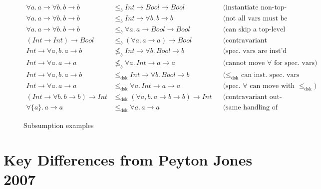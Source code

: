 \documentclass[11pt,a4paper]{article}
\begin{document}
\begin{figure}[h]
\centering
\small
\begin{align*}
\forall a.\, a \to \forall b.\, b \to b &\leq_b \mathit{Int} \to \mathit{Bool} \to \mathit{Bool} 
&&\text{(instantiate non-top-level vars)} \\
\forall a.\, a \to \forall b.\, b \to b &\leq_b \mathit{Int} \to \forall b.\, b \to b 
&&\text{(not all vars must be instantiated)} \\
\forall a.\, a \to \forall b.\, b \to b &\leq_b \forall a.\, a \to \mathit{Bool} \to \mathit{Bool} 
&&\text{(can skip a top-level quantifier)} \\
(\mathit{Int} \to \mathit{Int}) \to \mathit{Bool} &\leq_b (\forall a.\, a \to a) \to \mathit{Bool} 
&&\text{(contravariant instantiation)} \\
\mathit{Int} \to \forall a, b.\, a \to b &\nleq_b \mathit{Int} \to \forall b.\, \mathit{Bool} \to b 
&&\text{(spec.~vars are inst'd from the right)} \\
\mathit{Int} \to \forall a.\, a \to a &\nleq_b \forall a.\, \mathit{Int} \to a \to a 
&&\text{(cannot move $\forall$ for spec.~vars)} \\
\mathit{Int} \to \forall a, b.\, a \to b &\leq_{\mathrm{dsk}} \mathit{Int} \to \forall b.\, \mathit{Bool} \to b 
&&\text{($\leq_{\mathrm{dsk}}$ can inst.~spec.~vars in any order)} \\
\mathit{Int} \to \forall a.\, a \to a &\leq_{\mathrm{dsk}} \forall a.\, \mathit{Int} \to a \to a 
&&\text{(spec.~$\forall$ can move with $\leq_{\mathrm{dsk}}$)} \\
(\mathit{Int} \to \forall b.\, b \to b) \to \mathit{Int} &\leq_{\mathrm{dsk}} (\forall a, b.\, a \to b \to b) \to \mathit{Int} 
&&\text{(contravariant out-of-order inst.)} \\
\forall\{a\}.\, a \to a &\leq_{\mathrm{dsk}} \forall a.\, a \to a 
&&\text{(same handling of spec.~and gen.~vars)}
\end{align*}
\caption{Subsumption examples}
\label{fig:examples}
\end{figure}

\section{Key Differences from Peyton Jones 2007}
\end{document}
